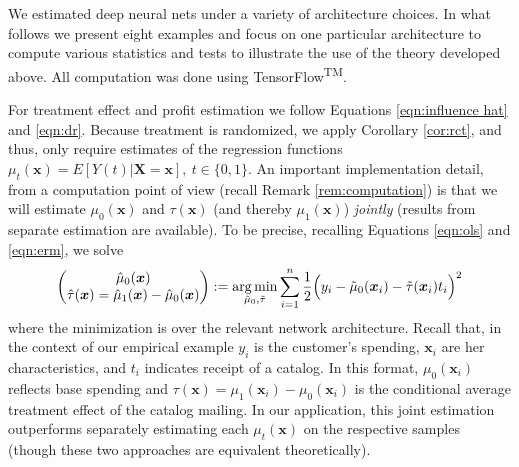 \documentclass[11pt]{article}
\numberwithin{equation}{section}
\theoremstyle{definition}
\DeclareMathOperator*{\argmin}{arg\,min}
\def\argmin{\operatornamewithlimits{arg\,min}}
\newcommand{\deq}{:=}
\newcommand{\bx}{\bm{x}}
\newcommand{\bX}{\bm{X}}
\begin{document}
We estimated deep neural nets under a variety of architecture choices.
In what follows we present eight examples
and focus on one particular architecture to compute various statistics
and tests to illustrate the use of the theory developed above. All computation was done using TensorFlow\textsuperscript{\tiny TM}.

For treatment effect and profit estimation we follow Equations \eqref{eqn:influence hat} and \eqref{eqn:dr}. Because treatment is randomized, we apply Corollary \ref{cor:rct}, and thus, only require estimates of the regression functions $\mu_t(\bx) = E[Y(t) \vert \bX=\bx], \ t \in \{0,1\}$. An important implementation detail, from a computation point of view (recall Remark \ref{rem:computation}) is that we will estimate $\mu_0(\bx)$ and $\tau(\bx)$ (and thereby $\mu_1(\bx)$) \emph{jointly} (results from separate estimation are available). To be precise, recalling Equations \eqref{eqn:ols} and \eqref{eqn:erm}, we solve
\begin{align}
	\label{eqn:joint}
	\begin{pmatrix}
		\hat{\mu}_0(\bx) \\ 
		\hat{\tau}(\bx) = \hat{\mu}_1(\bx) - \hat{\mu}_0(\bx) 
	\end{pmatrix} 
	\deq \argmin_{\tilde{\mu}_0, \tilde{\tau}}   \sum_{i=1}^n \frac{1}{2} \Big( y_i - \tilde{\mu}_0(\bx_i) - \tilde{\tau}(\bx_i) t_i \Big)^2
\end{align}
where the minimization is over the relevant network architecture. Recall that, in the context of our empirical example $y_i$ is the customer's spending, $\bx_i$ are her characteristics, and $t_i$ indicates receipt of a catalog. In this format, $\mu_0(\bx_i)$ reflects base spending and $\tau(\bx) = \mu_1(\bx_i) - \mu_0(\bx_i)$ is the conditional average treatment effect of the catalog mailing. In our application, this joint estimation outperforms separately estimating each $\mu_t(\bx)$ on the respective samples (though these two approaches are equivalent theoretically). 
\end{document}

